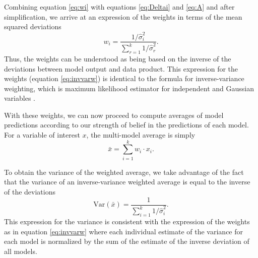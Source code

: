 \documentclass[gmd, manuscript]{copernicus}
\begin{document}
Combining equation \eqref{eq:wi} with equations \eqref{eq:Deltai} and \eqref{eq:A} and after simplification, we arrive at an expression of the weights in terms of the mean squared deviations
\begin{equation} \label{eq:invvarw}
w_i = \frac{1/\hat{\sigma}^2_i}{\sum^k_{r=1} 1/\hat{\sigma}^2_r}.
\end{equation}
Thus, the weights can be understood as being based on the inverse of the deviations between model output and data product. This expression for the weights (equation \ref{eq:invvarw}) is identical to the formula for inverse-variance weighting, which is maximum likelihood estimator for independent and Gaussian variables \citep{Bonamente2022}.

With these weights, we can now proceed to compute averages of model predictions according to our strength of belief in the predictions of each model. 
For a variable of interest $x$, the multi-model average is simply
\begin{equation}
\bar{x} = \sum_{i=1}^k w_i \cdot x_i.
\end{equation}

To obtain the variance of the weighted average, we take advantage of the fact that the variance of an inverse-variance weighted average is equal to the inverse of the deviations \citep{Hartung2008, Bonamente2022, Kanters2022}
\begin{equation}
\mathrm{Var}(\bar{x}) = \frac{1}{\sum_{i=1}^k 1/\hat{\sigma}_i^2}.
\end{equation}
This expression for the variance is consistent with the expression of the weights as in equation \eqref{eq:invvarw} where each individual estimate of the variance for each model is normalized by the sum of the estimate of the inverse deviation of all models.

\end{document}
